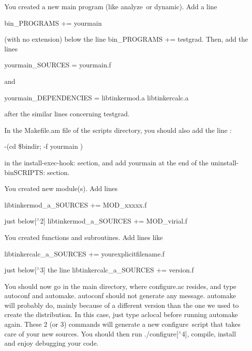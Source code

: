 \begin{DoxyEnumerate}
\item You created a new main program (like {\ttfamily analyze} or {\ttfamily dynamic}). Add a line

{\ttfamily bin\-\_\-\-P\-R\-O\-G\-R\-A\-M\-S += yourmain}

(with no extension) below the line {\ttfamily bin\-\_\-\-P\-R\-O\-G\-R\-A\-M\-S += testgrad}. Then, add the lines

{\ttfamily yourmain\-\_\-\-S\-O\-U\-R\-C\-E\-S = yourmain.\-f}

and

{\ttfamily yourmain\-\_\-\-D\-E\-P\-E\-N\-D\-E\-N\-C\-I\-E\-S = libtinkermod.\-a libtinkercalc.\-a}

after the similar lines concerning {\ttfamily testgrad}.

In the {\ttfamily Makefile.\-am} file of the {\ttfamily scripts} directory, you should also add the line \-:

{\ttfamily -\/(cd \$}{\ttfamily bindir}{\ttfamily ;  -\/f  yourmain )}

in the {\ttfamily install-\/exec-\/hook\-:} section, and add {\ttfamily yourmain} at the end of the {\ttfamily uninstall-\/bin\-S\-C\-R\-I\-P\-T\-S\-:} section.
\item You created new module(s). Add lines

{\ttfamily libtinkermod\-\_\-a\-\_\-\-S\-O\-U\-R\-C\-E\-S += M\-O\-D\-\_\-xxxxx.\-f}

just below\mbox{[}$^\wedge$2\mbox{]} {\ttfamily libtinkermod\-\_\-a\-\_\-\-S\-O\-U\-R\-C\-E\-S += M\-O\-D\-\_\-virial.\-f}
\item You created functions and subroutines. Add lines like

{\ttfamily libtinkercalc\-\_\-a\-\_\-\-S\-O\-U\-R\-C\-E\-S += yourexplicitfilename.\-f}

just below\mbox{[}$^\wedge$3\mbox{]} the line {\ttfamily libtinkercalc\-\_\-a\-\_\-\-S\-O\-U\-R\-C\-E\-S += version.\-f}
\end{DoxyEnumerate}

You should now go in the main directory, where {\ttfamily configure.\-ac} resides, and type {\ttfamily autoconf} and {\ttfamily automake}. {\ttfamily autoconf} should not generate any message. {\ttfamily automake} will probably do, mainly because of a different version than the one we used to create the distribution. In this case, just type {\ttfamily aclocal} before running {\ttfamily automake} again. These 2 (or 3) commands will generate a new {\ttfamily configure} script that takes care of your new sources. You should then run {\ttfamily ./}{\ttfamily configure}\mbox{[}$^\wedge$4\mbox{]}, compile, install and enjoy debugging your code.

